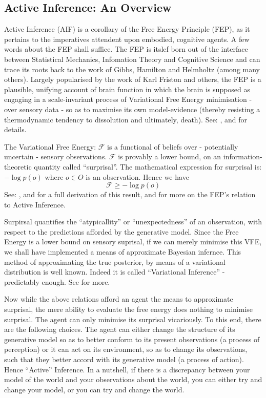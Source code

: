 \documentclass[12pt, twoside]{report}
\begin{document}
\subsection{Active Inference: An Overview}
Active Inference (AIF) is a corollary of the Free Energy Principle (FEP), as it pertains to the imperatives attendent upon embodied, cognitive agents. A few words about the FEP shall suffice. The FEP is itslef born out of the interface between Statistical Mechanics, Infomation Theory and Cognitive Science and can trace its roots back to the work of Gibbs, Hamilton and Helmholtz (among many others). Largely popularised by the work of Karl Friston and others, the FEP is a plausible, unifying account of brain function in which the brain is supposed as engaging in a scale-invariant process of Variational Free Energy minimisation - over sensory data - so as to maximise its own model-evidence (thereby resisting a thermodynamic tendency to dissolution and ultimately, death). See: \textcite{FEP-Rough-Guide-Brain}, \textcite{Action-Behaviour-FE} and \textcite{FEP-Math-Review} for details. 

The Variational Free Energy: $\mathcal{F}$ is a functional of beliefs over - potentially uncertain - sensory observations. $\mathcal{F}$ is provably a lower bound, on an information-theoretic quantity called ``surprisal''. The mathematical expression for surprisal is: $-\log{p(o)}$ where $o \in O$ is an observation. Hence we have $$\mathcal{F} \geq -\log{p(o)}$$ See: \textcite{FEP-Rough-Guide-Brain}, \textcite{Action-Behaviour-FE} and \textcite{FEP-Math-Review} for a full derivation of this result, and for more on the FEP's relation to Active Inference.    

Surpirsal quantifies the ``atypicallity'' or ``unexpectedness'' of an observation, with respect to the predictions afforded by the generative model. Since the Free Energy is a lower bound on sensory suprisal, if we can merely minimise this VFE, we shall have implemented a means of approximate Bayesian infernce. This method of approximating the true posterior, by means of a variational distribution is well known. Indeed it is called ``Variational Inference'' - predictably enough. See \textcite{VI} for more. 

Now while the above relations afford an agent the means to approximate surprisal, the mere ability to evaluate the free energy does nothing to minimise surprisal. The agent can only minimise its surprisal vicariously. To this end, there are the following choices. The agent can either change the structure of its generative model so as to better conform to its present observations (a process of perception) or it can act on its environment, so as to change its observations, such that they better accord with its generative model (a process of action). Hence ``Active'' Inference. In a nutshell, if there is a discrepancy between your model of the world and your observations about the world, you can either try and change your model, or you can try and change the world.  
\end{document}
